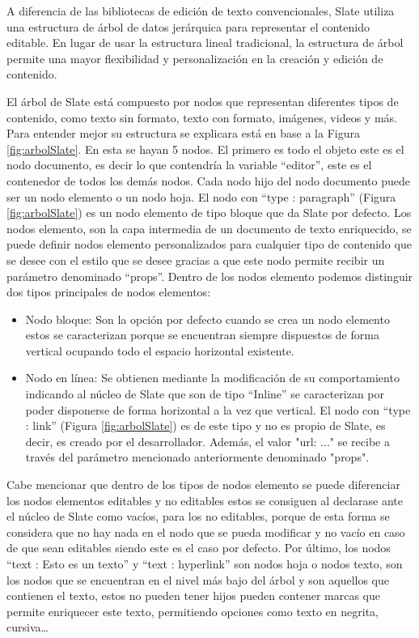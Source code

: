 A diferencia de las bibliotecas de edición de texto convencionales, Slate utiliza una estructura de árbol de datos jerárquica para representar el contenido editable. En lugar de usar la estructura lineal tradicional, la estructura de árbol permite una mayor flexibilidad y personalización en la creación y edición de contenido.

El árbol de Slate está compuesto por nodos que representan diferentes tipos de contenido, como texto sin formato, texto con formato, imágenes, videos y más. Para entender mejor su estructura se explicara está en base a la Figura \ref{fig:arbolSlate}. En esta se hayan 5 nodos. El primero es todo el objeto este es el nodo documento, es decir lo que contendría la variable ``editor'', este es el contenedor de todos los demás nodos. Cada nodo hijo del nodo documento puede ser un nodo elemento o un nodo hoja.  
El nodo con ``type : paragraph'' (Figura \ref{fig:arbolSlate}) es un nodo elemento de tipo bloque que da Slate por defecto. Los nodos elemento, son la capa intermedia de un documento de texto enriquecido, se puede definir nodos elemento personalizados para cualquier tipo de contenido que se desee con el estilo que se desee gracias a que este nodo permite recibir un parámetro denominado ``props''. Dentro de los nodos elemento podemos distinguir dos tipos principales de nodos elementos:

\begin{itemize}
  \item Nodo bloque: Son la opción por defecto cuando se crea un nodo elemento estos se caracterizan porque se encuentran siempre dispuestos de forma vertical ocupando todo el espacio horizontal existente.
  \item Nodo en línea: Se obtienen mediante la modificación de su comportamiento indicando al núcleo de Slate que son de tipo ``Inline'' se caracterizan por poder disponerse de forma horizontal a la vez que vertical.  El nodo con ``type : link'' (Figura \ref{fig:arbolSlate}) es de este tipo y no es propio de Slate, es decir, es creado por el desarrollador. Además, el valor "url: ..." se recibe a través del parámetro mencionado anteriormente denominado "props".
\end{itemize}

Cabe mencionar que dentro de los tipos de nodos elemento se puede diferenciar los nodos elementos editables y no editables estos se consiguen al declarase ante el núcleo de Slate como vacíos, para los no editables, porque de esta forma se considera que no hay nada en el nodo que se pueda modificar y no vacío en caso de que sean editables siendo este es el caso por defecto. 
Por último, los nodos ``text : Esto es un texto'' y ``text : hyperlink'' son nodos hoja o nodos texto, son los nodos que se encuentran en el nivel más bajo del árbol y son aquellos que contienen el texto, estos no pueden tener hijos pueden contener marcas que permite enriquecer este texto, permitiendo opciones como texto en negrita, cursiva…

